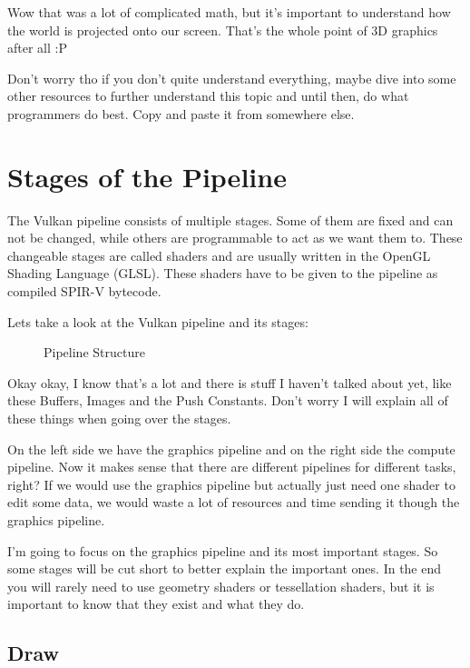 \documentclass[12pt]{report} \usepackage{preamble}
\begin{document}
Wow that was a lot of complicated math, but it's important to understand how the world is
projected onto our screen. That's the whole point of 3D graphics after all :P

Don't worry tho if you don't quite understand everything, maybe dive into some other resources to further
understand this topic and until then, do what programmers do best. Copy and paste it from somewhere else.

\section{Stages of the Pipeline}

The Vulkan pipeline consists of multiple stages. Some of them are fixed
and can not be changed, while others are programmable to act as we
want them to. These changeable stages are called shaders and are usually
written in the OpenGL Shading Language (GLSL). These shaders have to be
given to the pipeline as compiled SPIR-V bytecode. \cite{spirv}

Lets take a look at the Vulkan pipeline and its stages:

\begin{figure}[hbtp]
	\fontsize{6}{10}\selectfont
	\centering 
	\caption{Pipeline Structure \cite{fig:pipeline}}
\end{figure} \FloatBarrier

Okay okay, I know that's a lot and there is stuff I haven't talked about
yet, like these Buffers, Images and the Push Constants. Don't worry I
will explain all of these things when going over the stages.

On the left side we have the graphics pipeline and on the right side the
compute pipeline. Now it makes sense that there are different pipelines
for different tasks, right? If we would use the graphics pipeline but
actually just need one shader to edit some data, we would waste a lot
of resources and time sending it though the graphics pipeline.

I'm going to focus on the graphics pipeline and its most important stages.
So some stages will be cut short to better explain the important ones.
In the end you will rarely need to use geometry shaders or tessellation
shaders, but it is important to know that they exist and what they do.

\subsection{Draw}
\end{document}
